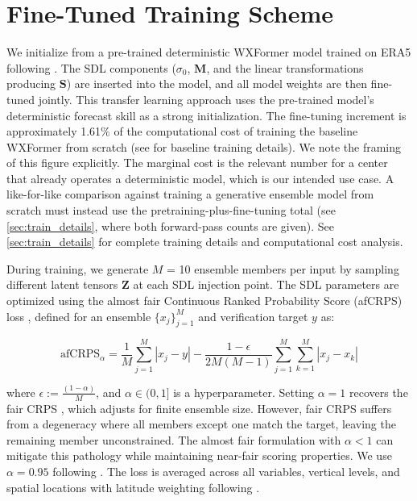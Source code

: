 \documentclass{agujournal2019}
\begin{document}
\section{Fine-Tuned Training Scheme}


We initialize from a pre-trained deterministic WXFormer model trained on ERA5 following \cite{schreck2025}. The SDL components ($\sigma_0$, $\mathbf{M}$, and the linear transformations producing $\mathbf{S}$) are inserted into the model, and all model weights are then fine-tuned jointly. This transfer learning approach uses the pre-trained model's deterministic forecast skill as a strong initialization. The fine-tuning increment is approximately 1.61\% of the computational cost of training the baseline WXFormer from scratch (see \cite{schreck2025} for baseline training details). We note the framing of this figure explicitly. The marginal cost is the relevant number for a center that already operates a deterministic model, which is our intended use case. A like-for-like comparison against training a generative ensemble model from scratch must instead use the pretraining-plus-fine-tuning total (see \ref{sec:train_details}, where both forward-pass counts are given). See \ref{sec:train_details} for complete training details and computational cost analysis.

During training, we generate $M$ = 10 ensemble members per input by sampling different latent tensors $\mathbf{Z}$ at each SDL injection point. The SDL parameters are optimized using the almost fair Continuous Ranked Probability Score (afCRPS) loss \cite{lang2024aifs}, defined for an ensemble $\{x_j\}_{j=1}^M$ and verification target $y$ as:

\begin{equation}
\text{afCRPS}_\alpha = \frac{1}{M}\sum_{j=1}^M |x_j - y| - \frac{1-\epsilon}{2M(M-1)}\sum_{j=1}^M\sum_{k=1}^M |x_j - x_k|
\label{eq:afcrps}
\end{equation}

where $\epsilon := \frac{(1-\alpha)}{M}$, and $\alpha \in (0,1]$ is a hyperparameter. Setting $\alpha = 1$ recovers the fair CRPS \cite{ferro2013fair}, which adjusts for finite ensemble size. However, fair CRPS suffers from a degeneracy where all members except one match the target, leaving the remaining member unconstrained. The almost fair formulation with $\alpha < 1$ can mitigate this pathology while maintaining near-fair scoring properties. We use $\alpha = 0.95$ following \cite{lang2024aifs}. The loss is averaged across all variables, vertical levels, and spatial locations with latitude weighting following \cite{schreck2025}.
\end{document}

